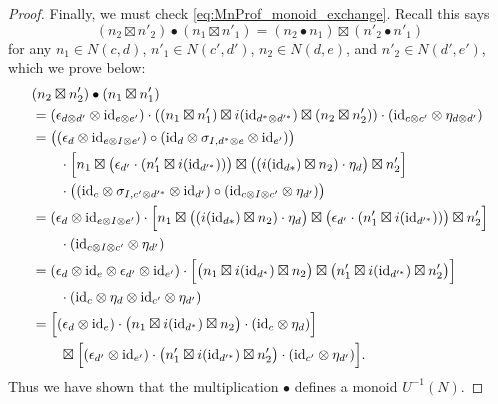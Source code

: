 \documentclass[11pt,oneside,article]{memoir}
\begin{document}
\begin{proof}
   Finally, we must check \eqref{eq:MnProf_monoid_exchange}. Recall this says
   \[
      (n_2\boxtimes n'_2)\bullet(n_1\boxtimes n'_1)=(n_2\bullet n_1)\boxtimes(n'_2\bullet n'_1)
   \]
   for any $n_1\in N(c,d)$, $n'_1\in N(c',d')$, $n_2\in N(d,e)$, and $n'_2\in N(d',e')$, which we
   prove below:
   \begin{align*}
      &(n_2\boxtimes n'_2)\bullet(n_1\boxtimes n'_1) \\
      &= (\epsilon_{d\otimes d'}\otimes\mathrm{id}_{e\otimes e'})
         \cdot \left((n_1\boxtimes n'_1)\boxtimes i(\mathrm{id}_{d^*\otimes d'^{*}})
            \boxtimes(n_2\boxtimes n'_2)\right)
         \cdot (\mathrm{id}_{c\otimes c'}\otimes\eta_{d\otimes d'}) \\
      &= \bigl((\epsilon_d\otimes\mathrm{id}_{e\otimes I\otimes e'})
            \circ(\mathrm{id}_d\otimes\sigma_{I,d^*\otimes e}\otimes\mathrm{id}_{e'})\bigr) \\
      &\qquad \cdot \Bigl[n_1\boxtimes\bigl(\epsilon_{d'}\cdot(n'_1\boxtimes i(\mathrm{id}_{d'^{*}}))\bigr)
            \boxtimes \bigl((i(\mathrm{id}_{d*})\boxtimes n_2)\cdot\eta_d\bigr)\boxtimes n'_2\Bigr] \\
      &\qquad \cdot \bigl((\mathrm{id}_c\otimes\sigma_{I,c'\otimes d'^*}\otimes\mathrm{id}_{d'})
            \circ (\mathrm{id}_{c\otimes I\otimes c'}\otimes\eta_{d'}) \bigr) \\
      &= (\epsilon_d\otimes\mathrm{id}_{e\otimes I\otimes e'})
         \cdot \Bigl[n_1\boxtimes\bigl((i(\mathrm{id}_{d*})\boxtimes n_2)\cdot\eta_d\bigr)
            \boxtimes \bigl(\epsilon_{d'}\cdot(n'_1\boxtimes i(\mathrm{id}_{d'^{*}}))\bigr)
            \boxtimes n'_2\Bigr] \\
      &\qquad \cdot (\mathrm{id}_{c\otimes I\otimes c'}\otimes\eta_{d'}) \\
      &= (\epsilon_d\otimes\mathrm{id}_e\otimes\epsilon_{d'}\otimes\mathrm{id}_{e'})
         \cdot \Bigl[\bigl(n_1\boxtimes i(\mathrm{id}_{d^*})\boxtimes n_2\bigr)
            \boxtimes \bigl(n'_1\boxtimes i(\mathrm{id}_{d'^*})\boxtimes n'_2\bigr)\Bigr] \\
      &\qquad \cdot(\mathrm{id}_c\otimes\eta_d\otimes\mathrm{id}_{c'}\otimes\eta_{d'}) \\
      &= \Bigl[(\epsilon_d\otimes\mathrm{id}_e)
            \cdot \bigl(n_1\boxtimes i(\mathrm{id}_{d^*})\boxtimes n_2\bigr)
            \cdot (\mathrm{id}_c\otimes\eta_d)\Bigr] \\
      &\qquad \boxtimes \Bigl[(\epsilon_{d'}\otimes\mathrm{id}_{e'})
            \cdot \bigl(n'_1\boxtimes i(\mathrm{id}_{d'^*})\boxtimes n'_2\bigr)
            \cdot (\mathrm{id}_{c'}\otimes\eta_{d'})\Bigr].
   \end{align*}
   Thus we have shown that the multiplication $\bullet$ defines a monoid $U^{-1}(N)$.


\end{proof}
\end{document}

